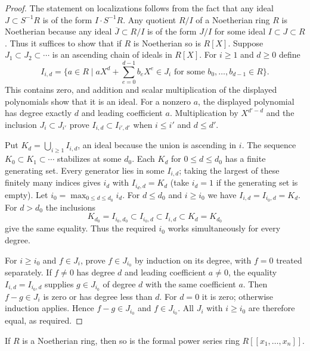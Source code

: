 \begin{proof}
The statement on localizations follows from the fact
that any ideal $J \subset S^{-1}R$ is of the form
$I \cdot S^{-1}R$. Any quotient $R/I$ of a Noetherian
ring $R$ is Noetherian because any ideal $\overline{J} \subset R/I$
is of the form $J/I$ for some ideal $I \subset J \subset R$.
Thus it suffices to show that if $R$ is Noetherian so
is $R[X]$. Suppose $J_1\subset J_2\subset\cdots$ is an ascending
chain of ideals in $R[X]$. For $i\geq1$ and $d\geq0$ define
$$
I_{i,d}=\{a\in R\mid aX^d+\sum_{e=0}^{d-1}b_eX^e\in J_i
\text{ for some }b_0,\ldots,b_{d-1}\in R\}.
$$
This contains zero, and addition and scalar multiplication of the
displayed polynomials show that it is an ideal. For a nonzero $a$,
the displayed polynomial has degree exactly $d$ and leading
coefficient $a$. Multiplication by $X^{d'-d}$ and the inclusion
$J_i\subset J_{i'}$ prove $I_{i,d}\subset I_{i',d'}$ when
$i\leq i'$ and $d\leq d'$.

\medskip\noindent
Put $K_d=\bigcup_{i\geq1}I_{i,d}$, an ideal because the union is
ascending in $i$. The sequence $K_0\subset K_1\subset\cdots$
stabilizes at some $d_0$. Each $K_d$ for $0\leq d\leq d_0$ has a
finite generating set. Every generator lies in some $I_{i,d}$;
taking the largest of these finitely many indices gives $i_d$ with
$I_{i_d,d}=K_d$ (take $i_d=1$ if the generating set is empty).
Let $i_0=\max_{0\leq d\leq d_0}i_d$. For $d\leq d_0$ and
$i\geq i_0$ we have $I_{i,d}=I_{i_0,d}=K_d$.
For $d>d_0$ the inclusions
$$
K_{d_0}=I_{i_0,d_0}\subset I_{i_0,d}\subset I_{i,d}
\subset K_d=K_{d_0}
$$
give the same equality. Thus the required $i_0$ works simultaneously
for every degree.

\medskip\noindent
For $i\geq i_0$ and $f\in J_i$, prove $f\in J_{i_0}$ by induction
on its degree, with $f=0$ treated separately. If $f\ne0$ has degree
$d$ and leading coefficient $a\ne0$, the equality
$I_{i,d}=I_{i_0,d}$ supplies $g\in J_{i_0}$ of degree $d$ with
the same coefficient $a$. Then $f-g\in J_i$ is zero or has degree
less than $d$. For $d=0$ it is zero; otherwise induction applies.
Hence $f-g\in J_{i_0}$ and $f\in J_{i_0}$. All $J_i$ with
$i\geq i_0$ are therefore equal, as required.
\end{proof}

\begin{lemma}
\label{lemma-Noetherian-power-series}
If $R$ is a Noetherian ring, then so is the formal power
series ring $R[[x_1, \ldots, x_n]]$.
\end{lemma}


